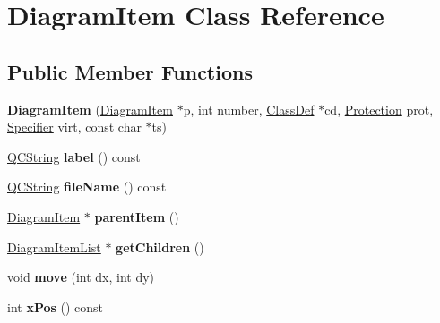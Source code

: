\hypertarget{class_diagram_item}{}\section{Diagram\+Item Class Reference}
\label{class_diagram_item}
\subsection*{Public Member Functions}
\begin{DoxyCompactItemize}
\item 
\mbox{\label{class_diagram_item_a4387e041c010990d1ef23d104ea082fe}} 
{\bfseries Diagram\+Item} (\mbox{\hyperlink{class_diagram_item}{Diagram\+Item}} $\ast$p, int number, \mbox{\hyperlink{class_class_def}{Class\+Def}} $\ast$cd, \mbox{\hyperlink{types_8h_a90e352184df58cd09455fe9996cd4ded}{Protection}} prot, \mbox{\hyperlink{types_8h_ab16236bdd10ddf4d73a9847350f0017e}{Specifier}} virt, const char $\ast$ts)
\item 
\mbox{\label{class_diagram_item_ab0d5760c4d7ff79eb2ed90652a825b54}} 
\mbox{\hyperlink{class_q_c_string}{Q\+C\+String}} {\bfseries label} () const
\item 
\mbox{\label{class_diagram_item_a34be8e5248b077c87e60b541ecaad327}} 
\mbox{\hyperlink{class_q_c_string}{Q\+C\+String}} {\bfseries file\+Name} () const
\item 
\mbox{\label{class_diagram_item_ab2289efb497a6181accc11324b2007bb}} 
\mbox{\hyperlink{class_diagram_item}{Diagram\+Item}} $\ast$ {\bfseries parent\+Item} ()
\item 
\mbox{\label{class_diagram_item_a30aa024181c7ddd574492cfce67cc19e}} 
\mbox{\hyperlink{class_diagram_item_list}{Diagram\+Item\+List}} $\ast$ {\bfseries get\+Children} ()
\item 
\mbox{\label{class_diagram_item_aca2295801c4b08a1565e86da1c04c242}} 
void {\bfseries move} (int dx, int dy)
\item 
\mbox{\label{class_diagram_item_a52e55a18b0b5892a58aa699962418612}} 
int {\bfseries x\+Pos} () const
\item 

\end{DoxyCompactItemize}
